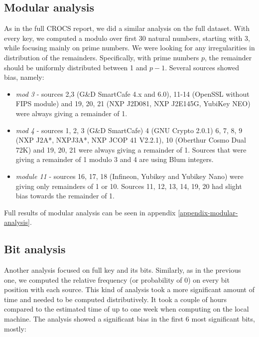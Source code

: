 \subsection{Modular analysis}

As in the full CROCS report\cite{svenda_full}, we did a similar analysis on the full dataset. With every key, we computed a modulo over first 30 natural numbers, starting with 3, while focusing mainly on prime numbers. We were looking for any irregularities in distribution of the remainders. Specifically, with prime numbers $p$, the remainder should be uniformly distributed between 1 and $p-1$. Several sources showed bias, namely:

\begin{itemize}

\item \textit{mod 3} - sources 2,3 (G\&D SmartCafe 4.x and 6.0), 11-14 (OpenSSL without FIPS module) and 19, 20, 21 (NXP J2D081, NXP J2E145G, YubiKey NEO) were always giving a remainder of 1.

\item \textit{mod 4} - sources 1, 2, 3 (G\&D SmartCafe) 4 (GNU Crypto 2.0.1) 6, 7, 8, 9 (NXP J2A*, NXPJ3A*, NXP JCOP 41 V2.2.1), 10 (Oberthur Cosmo Dual 72K) and 19, 20, 21 were always giving a remainder of 1. Sources that were giving a remainder of 1 modulo 3 and 4 are using Blum integers.

\item \textit{module 11} - sources 16, 17, 18 (Infineon, Yubikey and Yubikey Nano) were giving only remainders of 1 or 10. Sources 11, 12, 13, 14, 19, 20 had slight bias towards the remainder of 1.

\end{itemize}

\noindent
Full results of modular analysis can be seen in appendix \ref{appendix-modular-analysis}.

\subsection{Bit analysis}

Another analysis focused on full key and its bits. Similarly, as in the previous one, we computed the relative frequency (or probability of 0) on every bit position with each source. This kind of analysis took a more significant amount of time and needed to be computed distributively. It took a couple of hours compared to the estimated time of up to one week when computing on the local machine. The analysis showed a significant bias in the first 6 most significant bits, mostly:

